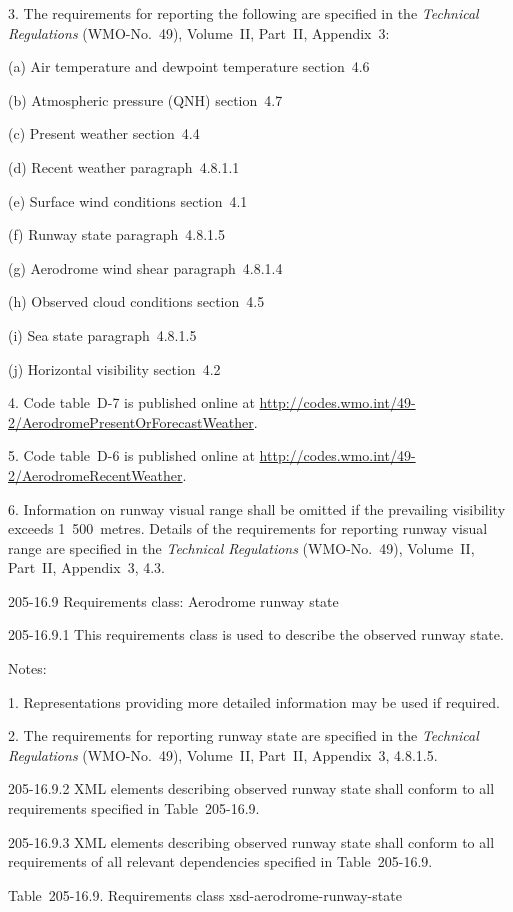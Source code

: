 3. The requirements for reporting the following are specified in the \emph{Technical Regulations} (WMO-No.~49), Volume~II, Part~II, Appendix~3:

(a) Air temperature and dewpoint temperature section~4.6

(b) Atmospheric pressure (QNH) section~4.7

(c) Present weather section~4.4

(d) Recent weather paragraph~4.8.1.1

(e) Surface wind conditions section~4.1

(f) Runway state paragraph~4.8.1.5

(g) Aerodrome wind shear paragraph~4.8.1.4

(h) Observed cloud conditions section~4.5

(i) Sea state paragraph~4.8.1.5

(j) Horizontal visibility section~4.2

4. Code table~D-7 is published online at \url{http://codes.wmo.int/49-2/AerodromePresentOrForecastWeather}.

5. Code table~D-6 is published online at \url{http://codes.wmo.int/49-2/AerodromeRecentWeather}.

6. Information on runway visual range shall be omitted if the prevailing visibility exceeds 1~500~metres. Details of the requirements for reporting runway visual range are specified in the \emph{Technical Regulations} (WMO-No.~49), Volume~II, Part~II, Appendix~3, 4.3.

205-16.9 Requirements class: Aerodrome runway state

205-16.9.1 This requirements class is used to describe the observed runway state.

Notes:

1. Representations providing more detailed information may be used if required.

2. The requirements for reporting runway state are specified in the \emph{Technical Regulations} (WMO-No.~49), Volume~II, Part~II, Appendix~3, 4.8.1.5.

205-16.9.2 XML elements describing observed runway state shall conform to all requirements specified in Table~205-16.9.

205-16.9.3 XML elements describing observed runway state shall conform to all requirements of all relevant dependencies specified in Table~205-16.9.

Table~205-16.9. Requirements class xsd-aerodrome-runway-state

